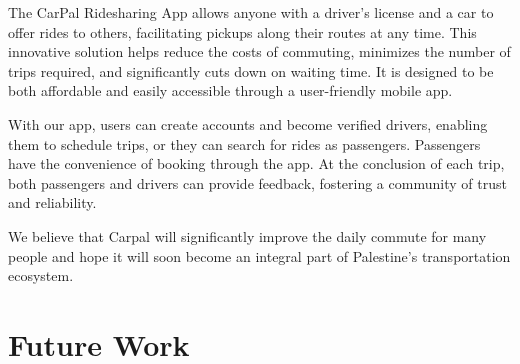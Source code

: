 \documentclass[a4paper, 12pt]{report} %
\begin{document}
        The CarPal Ridesharing App allows anyone with a driver's license and a car to offer rides to others, facilitating pickups along their routes at any time. This innovative solution helps reduce the costs of commuting, minimizes the number of trips required, and significantly cuts down on waiting time. It is designed to be both affordable and easily accessible through a user-friendly mobile app.

        With our app, users can create accounts and become verified drivers, enabling them to schedule trips, or they can search for rides as passengers. Passengers have the convenience of booking through the app. At the conclusion of each trip, both passengers and drivers can provide feedback, fostering a community of trust and reliability.

        We believe that Carpal will significantly improve the daily commute for many people and hope it will soon become an integral part of Palestine's transportation ecosystem.
        
    \section{Future Work}



    \printbibliography
\end{document}
